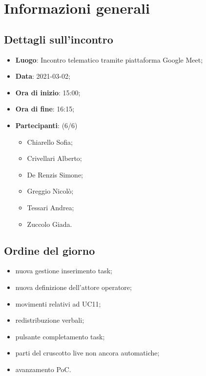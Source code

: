 \section{Informazioni generali}

\subsection{Dettagli sull'incontro}
\begin{itemize}
\item \textbf{Luogo}: Incontro telematico tramite piattaforma Google Meet;
\item \textbf{Data}: 2021-03-02;
\item \textbf{Ora di inizio}: 15:00;
\item \textbf{Ora di fine}: 16:15;
\item \textbf{Partecipanti}: (6/6)
\begin{itemize}
	\item Chiarello Sofia;
	\item Crivellari Alberto;
	\item De Renzis Simone;
	\item Greggio Nicolò;
	\item Tessari Andrea;
	\item Zuccolo Giada.
\end{itemize}
\end{itemize}

\subsection{Ordine del giorno}
\begin{itemize}
	\item nuova gestione inserimento task;
    \item nuova definizione dell'attore operatore;
    \item movimenti relativi ad UC11;
    \item redistribuzione verbali;
    \item pulsante completamento task;
    \item parti del cruscotto live non ancora automatiche;
    \item avanzamento PoC.

\end{itemize}



